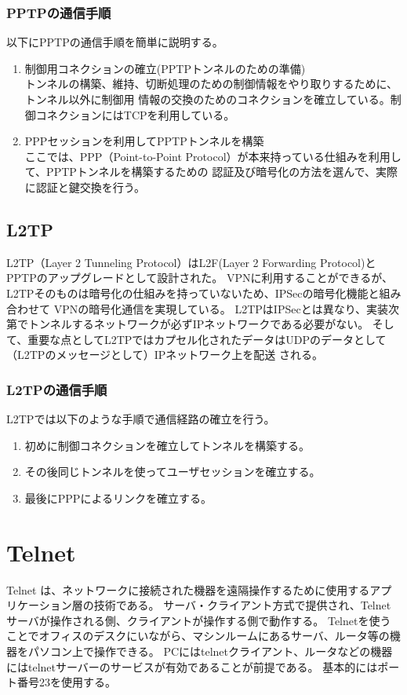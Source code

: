 \documentclass[11pt,a4j,titlepage]{jreport}
\begin{document}
\subsubsection*{PPTPの通信手順}
以下にPPTPの通信手順を簡単に説明する。
\begin{enumerate}
    \setlength{\parskip}{0.05cm} %
    \setlength{\itemsep}{0.05cm}
    \item 制御用コネクションの確立(PPTPトンネルのための準備)\mbox{}\\
    トンネルの構築、維持、切断処理のための制御情報をやり取りするために、トンネル以外に制御用
    情報の交換のためのコネクションを確立している。制御コネクションにはTCPを利用している。
    \item PPPセッションを利用してPPTPトンネルを構築\mbox{}\\
    ここでは、PPP（Point-to-Point Protocol）が本来持っている仕組みを利用して、PPTPトンネルを構築するための
    認証及び暗号化の方法を選んで、実際に認証と鍵交換を行う。
\end{enumerate}

\subsection{L2TP}
L2TP（Layer 2 Tunneling Protocol）\cite{RFC2661}はL2F(Layer 2 Forwarding Protocol)とPPTPのアップグレードとして設計された。
VPNに利用することができるが、L2TPそのものは暗号化の仕組みを持っていないため、IPSecの暗号化機能と組み合わせて
VPNの暗号化通信を実現している。
L2TPはIPSecとは異なり、実装次第でトンネルするネットワークが必ずIPネットワークである必要がない。
そして、重要な点としてL2TPではカプセル化されたデータはUDPのデータとして（L2TPのメッセージとして）IPネットワーク上を配送
される。
\subsubsection*{L2TPの通信手順}
L2TPでは以下のような手順で通信経路の確立を行う。
\begin{enumerate}
    \setlength{\parskip}{0.05cm} %
    \setlength{\itemsep}{0.05cm}
    \item 初めに制御コネクションを確立してトンネルを構築する。
    \item その後同じトンネルを使ってユーザセッションを確立する。
    \item 最後にPPPによるリンクを確立する。
\end{enumerate}


\section{Telnet}
Telnet \cite{RFC97}は、ネットワークに接続された機器を遠隔操作するために使用するアプリケーション層の技術である。
サーバ・クライアント方式で提供され、Telnetサーバが操作される側、クライアントが操作する側で動作する。
Telnetを使うことでオフィスのデスクにいながら、マシンルームにあるサーバ、ルータ等の機器をパソコン上で操作できる。
PCにはtelnetクライアント、ルータなどの機器にはtelnetサーバーのサービスが有効であることが前提である。
基本的にはポート番号23を使用する。
\end{document}
